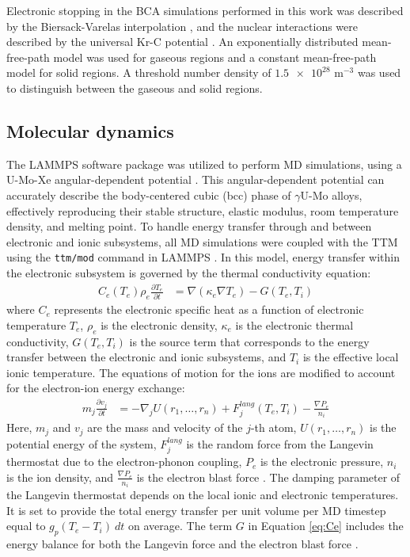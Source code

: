 \documentclass[review]{elsarticle}
\begin{document}
Electronic stopping in the BCA simulations performed in this work
was described by the Biersack-Varelas interpolation \cite{varelas1970},
and the nuclear interactions were described by the universal Kr-C potential
\cite{moller1984, eckstein2013}.
An exponentially distributed mean-free-path model was used for gaseous regions
and a constant mean-free-path model for solid regions.
A threshold number density of $\num{1.5e28}$ m$^{-3}$ was used to distinguish
between the gaseous and solid regions.

\subsection{Molecular dynamics}

The LAMMPS software package \cite{lammps} was utilized
to perform MD simulations,
using a U-Mo-Xe angular-dependent potential
\cite{smirnova2013, starikov2018, beelerADP}.
This angular-dependent potential can accurately describe
the body-centered cubic (bcc) phase of $\gamma$U-Mo alloys,
effectively reproducing their stable structure, elastic modulus,
room temperature density, and melting point.
To handle energy transfer through and between electronic and ionic subsystems,
all MD simulations were coupled with the TTM
using the \texttt{ttm/mod} command in LAMMPS \cite{norman2013, pisarev2014}.
In this model, energy transfer within the electronic subsystem
is governed by the thermal conductivity equation:
\begin{align}
	C_e (T_e) \rho_e \frac{\partial T_e}{\partial t}
		&= \nabla (\kappa_e \nabla T_e) - G (T_e, T_i)
	\label{eq:Ce}
\end{align}
where $C_e$ represents the electronic specific heat
as a function of electronic temperature $T_e$,
$\rho_e$ is the electronic density,
$\kappa_e$ is the electronic thermal conductivity,
$G (T_e, T_i)$ is the source term that corresponds to
the energy transfer between the electronic and ionic subsystems,
and $T_i$ is the effective local ionic temperature.
The equations of motion for the ions are modified
to account for the electron-ion energy exchange:
\begin{align}
	m_j \frac{\partial v_j}{\partial t}
		&= - \nabla_j U (r_1, \ldots, r_n)
		+ F_j^{lang} (T_e, T_i) - \frac{\nabla P_e}{n_i}
\end{align}
Here, $m_j$ and $v_j$ are the mass and velocity of the $j$-th atom,
$U (r_1, \dots, r_n)$ is the potential energy of the system,
$F_j^{lang}$ is the random force
from the Langevin thermostat due to the electron-phonon coupling,
$P_e$ is the electronic pressure,
$n_i$ is the ion density,
and $\frac{\nabla P_e}{n_i}$ is the electron blast force
\cite{chen2006, norman2013}.
The damping parameter of the Langevin thermostat
depends on the local ionic and electronic temperatures.
It is set to provide the total energy transfer per unit volume per MD timestep
equal to $g_p (T_e - T_i) \: dt$ on average.
The term $G$ in Equation \ref{eq:Ce} includes the energy balance
for both the Langevin force and the electron blast force
\cite{duffy2006, rutherford2007, norman2013, pisarev2014, kolotova2017}.
\end{document}
